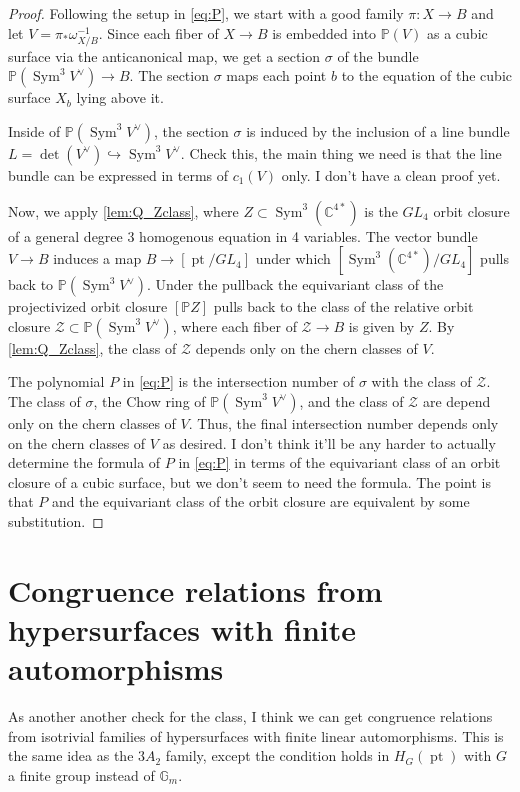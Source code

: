 \documentclass[12pt,reqno]{amsart}
\renewcommand{\to}{{\longrightarrow}}
\numberwithin{equation}{section}
\begin{document}
\begin{proof}
Following the setup in \eqref{eq:P}, we start with a good family $\pi: X\to B$ and let $V=\pi_{*}\omega_{X/B}^{-1}$. Since each fiber of $X\to B$ is embedded into $\mathbb{P}(V)$ as a cubic surface via the anticanonical map, we get a section $\sigma$ of the bundle $\mathbb{P}(\operatorname{Sym}^3 V^{\vee})\to B$. The section $\sigma$ maps each point $b$ to the equation of the cubic surface $X_b$ lying above it.

Inside of $\mathbb{P}(\operatorname{Sym}^3 V^{\vee})$, the section $\sigma$ is induced by the inclusion of a line bundle $L=\det(V^{\vee})\hookrightarrow \operatorname{Sym}^3 V^{\vee}$. {\color{red} Check this, the main thing we need is that the line bundle can be expressed in terms of $c_1(V)$ only. I don't have a clean proof yet.}

Now, we apply \autoref{lem:Q_Zclass}, where $Z\subset \operatorname{Sym}^3(\mathbb{C}^{4\ast})$ is the $GL_4$ orbit closure of a general degree 3 homogenous equation in 4 variables. The vector bundle $V\to B$ induces a map $B\to [\operatorname{pt}/GL_4]$ under which $[\operatorname{Sym}^3(\mathbb{C}^{4\ast})/GL_4]$ pulls back to $\mathbb{P}(\operatorname{Sym}^3 V^{\vee})$. Under the pullback the equivariant class of the projectivized orbit closure $[\mathbb{P}Z]$ pulls back to the class of the relative orbit closure $\mathcal{Z}\subset \mathbb{P}(\operatorname{Sym}^3 V^{\vee})$, where each fiber of $\mathcal{Z}\to B$ is given by $Z$. By \autoref{lem:Q_Zclass}, the class of $\mathcal{Z}$ depends only on the chern classes of $V$. 

The polynomial $P$ in \eqref{eq:P} is the intersection number of $\sigma$ with the class of $\mathcal{Z}$. The class of $\sigma$, the Chow ring of $\mathbb{P}(\operatorname{Sym}^3 V^{\vee})$, and the class of $\mathcal{Z}$ are depend only on the chern classes of $V$. Thus, the final intersection number depends only on the chern classes of $V$ as desired. 
{\color{red} I don't think it'll be any harder to actually determine the formula of $P$ in \eqref{eq:P} in terms of the equivariant class of an orbit closure of a cubic surface, but we don't seem to need the formula. The point is that $P$ and the equivariant class of the orbit closure are equivalent by some substitution.}
\end{proof}

\section{Congruence relations from hypersurfaces with finite automorphisms}
As another another check for the class, I think we can get congruence relations from isotrivial families of hypersurfaces with finite linear automorphisms. This is the same idea as the $3A_2$ family, except the condition holds in $H_{G}(\operatorname{pt})$ with $G$ a finite group instead of $\mathbb{G}_m$. 
\end{document}
